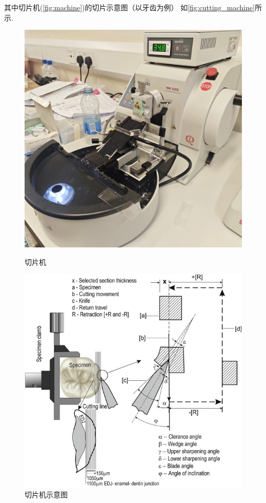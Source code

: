 
其中切片机(\autoref{fig:machine})的切片示意图（以牙齿为例） 如\autoref{fig:cutting_machine}所示\cite{4.1}.

\begin{figure}[htbp]
    \centering
    \begin{minipage}{0.35\textwidth}
        \centering
        \includegraphics[width=\textwidth]{./fig/machine.jpg}
        \caption{切片机}
        \label{fig:machine}
    \end{minipage}
    \begin{minipage}{0.35\textwidth}
        \centering
        \includegraphics[width=\textwidth]{./fig/10266_2018_353_Fig1_HTML.jpg}
        \caption{切片机示意图}
        \label{fig:cutting_machine}
    \end{minipage}
\end{figure}
